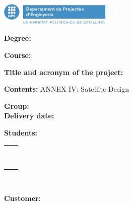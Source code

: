 
\thispagestyle{CoverPage}

\includegraphics[width=0.4\textwidth]{./doc_config/images/UPC_ProjectesEng1.png}

\hspace{30pt} {\scriptsize \textbf{\Seccio}}

\vspace{20pt}

\textbf{Degree:} \Degree

\textbf{Course:} \Course

\vspace{50pt}

\textbf{Title and acronym of the project:}

\hspace{10pt} \ProjectName

\hspace{10pt} \Acronym

\vspace{40pt}

\textbf{Contents:} ANNEX IV: Satellite Design

\vspace{20pt}

\textbf{Group:} \GrCode\\

\textbf{Delivery date:} \DocDate\\

\vspace{20pt}

\textbf{Students:}\vspace{7pt}

\begin{tabular}{ll}
	\Studi    \hspace*{30pt} & \Studii   \\
	\Studiii  \hspace*{30pt} & \Studiv   \\
	\Studv    \hspace*{30pt} & \Studvi   \\
	\Studvii  \hspace*{30pt} & \Studviii \\
	\Studix   \hspace*{30pt} & \Studx    \\
	\Studxi   \hspace*{30pt} & \Studxii  \\
	\Studxiii \hspace*{30pt} & \Studxiv  \\
	\Studxv   \hspace*{30pt} & \Studxvi  \\
	\Studxvii  \\
	
\end{tabular}\\

\vspace{15pt}

\textbf{Customer:} \Customer